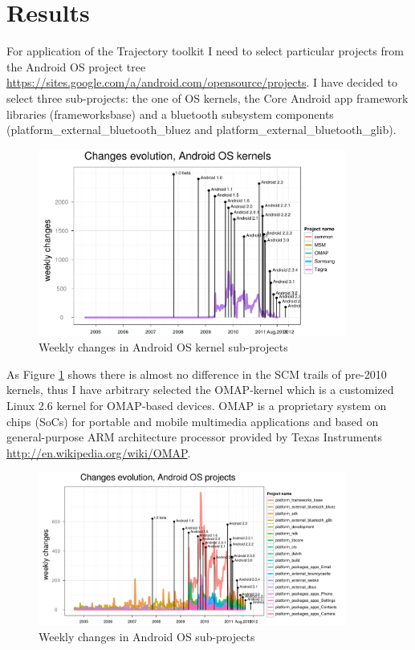 \documentclass[a4paper,10pt]{article}
\numberwithin{equation}{subsection}
\begin{document}
\section{Results}
For application of the Trajectory toolkit I need to select particular projects from the Android OS
project tree \url{https://sites.google.com/a/android.com/opensource/projects}. I have decided to 
select three sub-projects: the one of OS kernels, the Core Android app framework libraries 
(frameworks\/base) and a bluetooth subsystem components (platform\_external\_bluetooth\_bluez and 
platform\_external\_bluetooth\_glib).

\begin{figure}[htb]
  \centering
  \includegraphics[width=0.9\textwidth]{figures/kernels_changes.pdf}
  \caption{Weekly changes in Android OS kernel sub-projects}
  \label{fig:kernels_changes}
\end{figure}

As Figure \ref{fig:kernels_changes} shows there is almost no difference in the SCM trails of 
pre-2010 kernels, thus I have arbitrary selected the OMAP-kernel which is a customized 
Linux 2.6 kernel for OMAP-based devices. OMAP is a proprietary system on chips (SoCs) for 
portable and mobile multimedia applications and based on general-purpose ARM architecture 
processor provided by Texas Instruments \url{http://en.wikipedia.org/wiki/OMAP}.

\begin{figure}[htb]
  \centering
  \includegraphics[width=0.9\textwidth]{figures/projects_changes.pdf}
  \caption{Weekly changes in Android OS sub-projects}
  \label{fig:projects_changes}
\end{figure}
\end{document}
